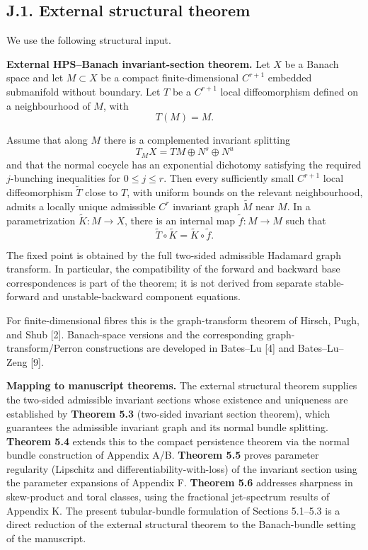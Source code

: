 \documentclass[12pt,a4paper]{article}
\theoremstyle{plain}
\numberwithin{equation}{section}
\numberwithin{theorem}{section}
\begin{document}
\subsection{J.1. External structural theorem}

We use the following structural input.

\textbf{External HPS--Banach invariant-section theorem.} Let $X$ be a Banach space and let $M\subset X$ be a compact finite-dimensional $C^{r+1}$ embedded submanifold without boundary. Let $T$ be a $C^{r+1}$ local diffeomorphism defined on a neighbourhood of $M$, with
\[
T(M)=M.
\]

Assume that along $M$ there is a complemented invariant splitting
\[
T_MX=TM\oplus N^s\oplus N^u
\]
and that the normal cocycle has an exponential dichotomy satisfying the required $j$-bunching inequalities for $0\le j\le r$. Then every sufficiently small $C^{r+1}$ local diffeomorphism $\widetilde T$ close to $T$, with uniform bounds on the relevant neighbourhood, admits a locally unique admissible $C^r$ invariant graph $\widetilde M$ near $M$. In a parametrization $\widetilde K:M\to X$, there is an internal map $\widetilde f:M\to M$ such that
\[
\widetilde T\circ \widetilde K
=
\widetilde K\circ \widetilde f.
\]

The fixed point is obtained by the full two-sided admissible Hadamard graph transform. In particular, the compatibility of the forward and backward base correspondences is part of the theorem; it is not derived from separate stable-forward and unstable-backward component equations.

For finite-dimensional fibres this is the graph-transform theorem of Hirsch, Pugh, and Shub [2]. Banach-space versions and the corresponding graph-transform/Perron constructions are developed in Bates--Lu [4] and Bates--Lu--Zeng [9].

\textbf{Mapping to manuscript theorems.} The external structural theorem supplies the two-sided admissible invariant sections whose existence and uniqueness are established by \textbf{Theorem 5.3} (two-sided invariant section theorem), which guarantees the admissible invariant graph and its normal bundle splitting. \textbf{Theorem 5.4} extends this to the compact persistence theorem via the normal bundle construction of Appendix A/B. \textbf{Theorem 5.5} proves parameter regularity (Lipschitz and differentiability-with-loss) of the invariant section using the parameter expansions of Appendix F. \textbf{Theorem 5.6} addresses sharpness in skew-product and toral classes, using the fractional jet-spectrum results of Appendix K. The present tubular-bundle formulation of Sections 5.1--5.3 is a direct reduction of the external structural theorem to the Banach-bundle setting of the manuscript.
\end{document}
